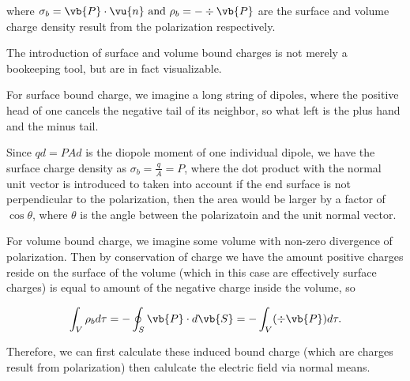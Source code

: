 \documentclass[english,a4paper,12pt]{report}
\begin{document}
where \(\sigma _{b} = \vb{P} \cdot \vu{n} \text { and } \rho _{b} = - \div{\vb{P} } \) are the surface and volume charge density result from the polarization respectively.

The introduction of surface and volume bound charges is not merely a bookeeping tool, but are in fact visualizable. 

For surface bound charge, we imagine a long string of dipoles, where the positive head of one cancels the negative tail of its neighbor, so what left is the plus hand and the minus tail.

Since \(qd = PAd\) is the diopole moment of one individual dipole, we have the surface charge density as \(\sigma _{b} = \frac{q}{A} = P\), where the dot product with the normal unit vector is introduced to taken into account if the end surface is not perpendicular to the polarization, then the area would be larger by a factor of \(\cos \theta \), where \(\theta \) is the angle between the polarizatoin and the unit normal vector.

For volume bound charge, we imagine some volume with non-zero divergence of polarization. Then by conservation of charge we have the amount positive charges reside on the surface of the volume (which in this case are effectively surface charges) is equal to amount of the negative charge inside the volume, so

\begin{equation}
    \int_{V}^{} \rho _{b} d\tau = - \oint_{S} \vb{P} \cdot d\vb{S} = - \int_{V}^{} (\div{\vb{P} } )d\tau . 
\end{equation}

Therefore, we can first calculate these induced bound charge (which are charges result from polarization) then calulcate the electric field via normal means.
\end{document}
